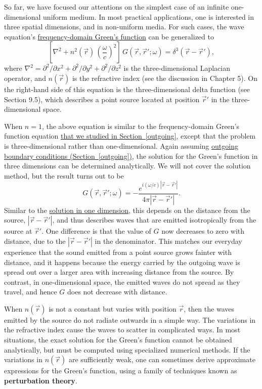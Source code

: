 \documentclass[10pt,a4paper]{article}
\begin{document}
So far, we have focused our attentions on the simplest case of an
infinite one-dimensional uniform medium. In most practical
applications, one is interested in three spatial dimensions, and in
non-uniform media. For such cases, the wave equation's
\hyperref[frequency-domain]{frequency-domain Green's function} can be
generalized to
\begin{equation}
  \left[\nabla^2 + n^2(\vec{r}) \, \left(\frac{\omega}{c}\right)^2\right]\, G(\vec{r},\vec{r}';\omega) = \delta^3(\vec{r}-\vec{r}'),  
\end{equation}
where $\nabla^2 = \partial^2/\partial x^2 + \partial^2/\partial y^2 +
\partial^2/\partial z^2$ is the three-dimensional Laplacian operator,
and $n(\vec{r})$ is the refractive index (see the discussion in
Chapter 5). On the right-hand side of this equation is the
three-dimensional delta function (see Section 9.5), which describes a
point source located at position $\vec{r}'$ in the three-dimensional
space.

When $n = 1$, the above equation is similar to the frequency-domain
Green's function equation \hyperref[outgoing]{that we studied in
  Section~\ref{outgoing}}, except that the problem is
three-dimensional rather than one-dimensional. Again assuming
\hyperref[outgoing]{outgoing boundary conditions
  (Section~\ref{outgoing})}, the solution for the Green's function in
three dimensions can be determined analytically. We will not cover the
solution method, but the result turns out to be
\begin{equation}
  G(\vec{r},\vec{r}';\omega) = -\frac{e^{i(\omega/c)|\vec{r}-\vec{r}'|}}{4\pi|\vec{r}-\vec{r}'|}.  
\end{equation}
Similar to the \hyperref[outgoing]{solution in one dimension}, this
depends on the distance from the source, $|\vec{r}-\vec{r}'|$, and
thus describes waves that are emitted isotropically from the source at
$\vec{r}'$. One difference is that the value of $G$ now decreases to
zero with distance, due to the $|\vec{r}-\vec{r}'|$ in the
denominator. This matches our everyday experience that the sound
emitted from a point source grows fainter with distance, and it
happens because the energy carried by the outgoing wave is spread out
over a larger area with increasing distance from the source. By
contrast, in one-dimensional space, the emitted waves do not spread as
they travel, and hence $G$ does not decrease with distance.

When $n(\vec{r})$ is not a constant but varies with position
$\vec{r}$, then the waves emitted by the source do not radiate
outwards in a simple way. The variations in the refractive index cause
the waves to scatter in complicated ways. In most situations, the
exact solution for the Green's function cannot be obtained
analytically, but must be computed using specialized numerical
methods. If the variations in $n(\vec{r})$ are sufficiently weak, one
can sometimes derive approximate expressions for the Green's function,
using a family of techniques known as \textbf{perturbation theory}.
\end{document}
